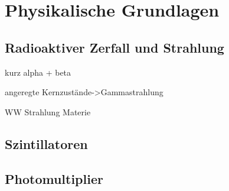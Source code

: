 \section{Physikalische Grundlagen}
\subsection{Radioaktiver Zerfall und Strahlung}
kurz alpha + beta

angeregte Kernzustände->Gammastrahlung

WW Strahlung Materie

\subsection{Szintillatoren}


\subsection{Photomultiplier}